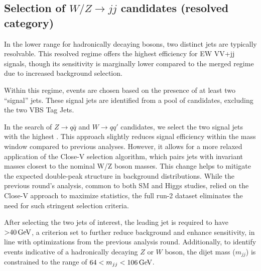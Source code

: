 

\subsection{Selection of $W/Z \to jj$ candidates (resolved category)}
\label{subsubsec:resolved_jets_selection}

In the lower \pt range for hadronically decaying bosons, two distinct jets are typically resolvable. This resolved regime offers the highest efficiency for EW VV+jj signals, though its sensitivity is marginally lower compared to the merged regime due to increased background selection.

Within this regime, events are chosen based on the presence of at least two ``signal'' jets. These signal jets are identified from a pool of candidates, excluding the two VBS Tag Jets.

In the search of $Z \to q\bar{q}$ and $W \to qq'$ candidates, we select the two signal jets with the highest \pt. This approach slightly reduces signal efficiency within the mass window compared to previous analyses. However, it allows for a more relaxed application of the Close-V selection algorithm, which pairs jets with invariant masses closest to the nominal W/Z boson masses. This change helps to mitigate the expected double-peak structure in background distributions. While the previous round's analysis, common to both SM and Higgs studies, relied on the Close-V approach to maximize statistics, the full run-2 dataset eliminates the need for such stringent selection criteria.

After selecting the two jets of interest, the leading jet is required to have \pt $\SI{>40}{\GeV}$, a criterion set to further reduce background and enhance sensitivity, in line with optimizations from the previous analysis round. Additionally, to identify events indicative of a hadronically decaying $Z$ or $W$ boson, the dijet mass ($m_{jj}$) is constrained to the range of $64 <m_{jj}<106\,\text{Ge\kern -0.1em V}$.

